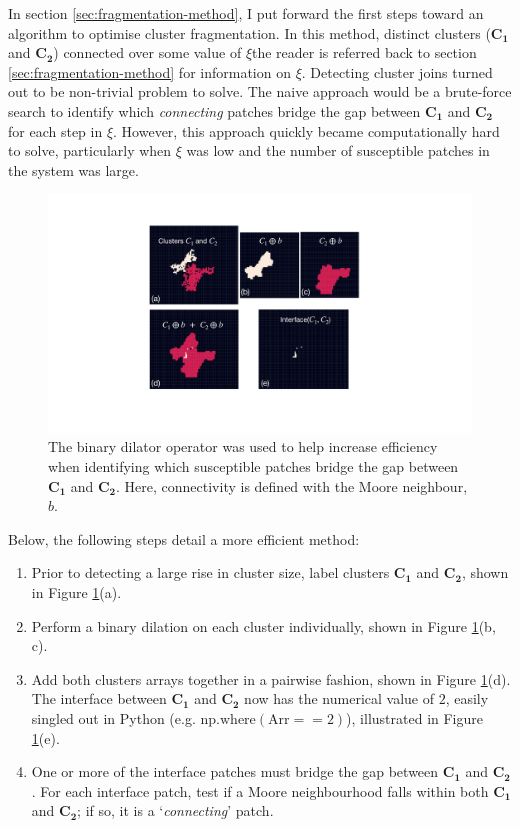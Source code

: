 In section \ref{sec:fragmentation-method}, I put forward the first steps toward an algorithm to optimise cluster fragmentation.
In this method, distinct clusters ($\mathbf{C_1}$ and $\mathbf{C_2}$) connected over some value of $\xi$\textemdash the reader is referred back to section \ref{sec:fragmentation-method} for information on $\xi$.
Detecting cluster joins turned out to be non-trivial problem to solve.
The naive approach would be a brute-force search to identify which \textit{connecting} patches bridge the gap between $\mathbf{C_1}$ and $\mathbf{C_2}$
for each step in $\xi$. 
However, this approach quickly became computationally hard to solve, particularly when $\xi$ was low and the number of susceptible patches in the system was large. 
\begin{figure}
    \centering
    \includegraphics[scale=0.4]{appendix/figures/bd-interface.pdf}
    \caption{The binary dilator operator was used to help increase efficiency when identifying which susceptible patches bridge the gap between $\mathbf{C_1}$ and $\mathbf{C_2}$.
            Here, connectivity is defined with the Moore neighbour, $b$.}
    \label{fig:a-bd-interface}
\end{figure}
Below, the following steps detail a more efficient method:
\begin{enumerate}
    \item Prior to detecting a large rise in cluster size, label clusters $\mathbf{C_1}$ and $\mathbf{C_2}$, shown in Figure \ref{fig:a-bd-interface}(a).
    \item Perform a binary dilation on each cluster individually, shown in Figure \ref{fig:a-bd-interface}(b, c).
    \item Add both clusters arrays together in a pairwise fashion, shown in Figure \ref{fig:a-bd-interface}(d). 
    The interface between $\mathbf{C_1}$ and $\mathbf{C_2}$ now has the numerical value of $2$, easily singled out in Python (e.g. $\mathrm{np.where(Arr==2)}$), illustrated in Figure \ref{fig:a-bd-interface}(e).
    \item One or more of the interface patches must bridge the gap between $\mathbf{C_1}$ and $\mathbf{C_2}$. For each interface patch, test if a Moore neighbourhood
    falls within both $\mathbf{C_1}$ and $\mathbf{C_2}$; if so, it is a `\textit{connecting}' patch.
\end{enumerate}

